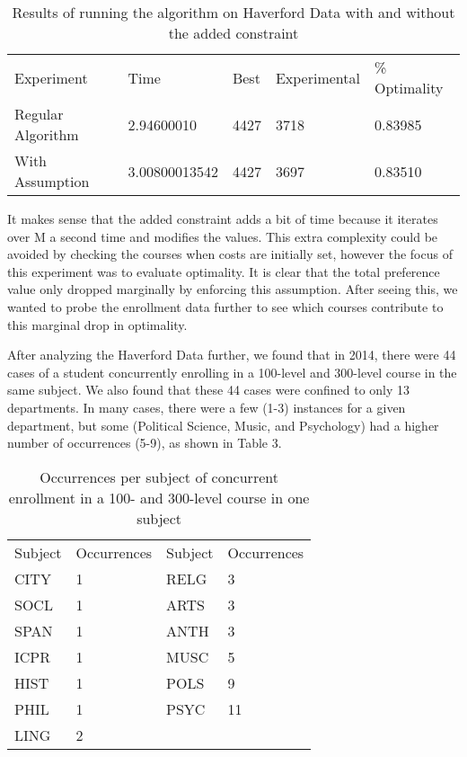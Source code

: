 \documentclass[11pt, oneside]{article}   	%
\begin{document}
\begin{enumerate}
\begin{table}[h]
\centering
\begin{tabular}{lllll}
Experiment        & Time          & Best & Experimental & \% Optimality \\
Regular Algorithm & 2.94600010    & 4427 & 3718         & 0.83985       \\
With Assumption   & 3.00800013542 & 4427 & 3697         & 0.83510      
\end{tabular}
\caption{Results of running the algorithm on Haverford Data with and without the added constraint}
\label{my-label}
\end{table}

It makes sense that the added constraint adds a bit of time because it iterates over M a second time and modifies the values. This extra complexity could be avoided by checking the courses when costs are initially set, however the focus of this experiment was to evaluate optimality. It is clear that the total preference value only dropped marginally by enforcing this assumption. After seeing this, we wanted to probe the enrollment data further to see which courses contribute to this marginal drop in optimality.

After analyzing the Haverford Data further, we found that in 2014, there were 44 cases of a student concurrently enrolling in a 100-level and 300-level course in the same subject. We also found that these 44 cases were confined to only 13 departments. In many cases, there were a few (1-3) instances for a given department, but some (Political Science, Music, and Psychology) had a higher number of occurrences (5-9), as shown in Table 3.\\

\begin{table}[h]
\centering
\begin{tabular}{llll}
Subject & Occurrences & Subject & Occurrences \\
CITY    & 1           & RELG    & 3           \\
SOCL    & 1           & ARTS    & 3           \\
SPAN    & 1           & ANTH    & 3           \\
ICPR    & 1           & MUSC    & 5           \\
HIST    & 1           & POLS    & 9           \\
PHIL    & 1           & PSYC    & 11          \\
LING    & 2           &         &             \\        
\end{tabular}
\caption{Occurrences per subject of concurrent enrollment in a 100- and 300-level course in one subject}
\label{my-label}
\end{table}


\end{enumerate}
\end{document}
